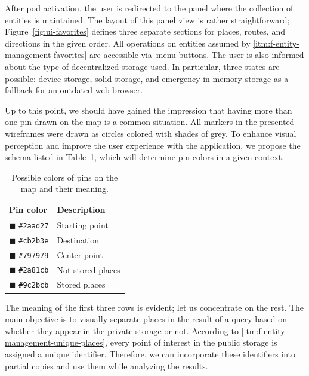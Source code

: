 After pod activation, the user is redirected to the panel where the collection of entities is maintained. The layout of this panel view is rather straightforward; Figure~\ref{fig:ui-favorites} defines three separate sections for places, routes, and directions in the given order. All operations on entities assumed by \ref{itm:f-entity-management-favorites} are accessible via~menu buttons. The user is also informed about the type of decentralized storage used. In particular, three states are possible: device storage, \acs{solid} storage, and emergency in-memory storage as a fallback for an outdated web browser.

Up to this point, we should have gained the impression that having more than one pin drawn on the map is a common situation. All markers in the presented wireframes were drawn as circles colored with shades of grey. To enhance visual perception and improve the user experience with the application, we propose the schema listed in Table~\ref{tab:pin-colors}, which will determine pin colors in a given context.

\bgroup
\def\arraystretch{1.2}
\begin{table}[h!]
\centering\footnotesize
\begin{tabular}{ l l }
\toprule
\textbf{Pin color}
  & \textbf{Description} \\
\midrule
\textcolor{SourcePlaceColor}{$\blacksquare$ \texttt{\#2aad27}}
  & Starting point \\
\textcolor{TargetPlaceColor}{$\blacksquare$ \texttt{\#cb2b3e}}
  & Destination \\
\textcolor{CenterPlaceColor}{$\blacksquare$ \texttt{\#797979}}
  & Center point \\
\textcolor{CommonPlaceColor}{$\blacksquare$ \texttt{\#2a81cb}}
  & Not stored places \\
\textcolor{StoredPlaceColor}{$\blacksquare$ \texttt{\#9c2bcb}}
  & Stored places \\
\bottomrule
\end{tabular}
\caption{Possible colors of pins on the map and their meaning.}
\label{tab:pin-colors}
\end{table}
\egroup

The meaning of the first three rows is evident; let us concentrate on the rest. The main objective is to visually separate places in the result of a query based on whether they appear in the private storage or not. According to \ref{itm:f-entity-management-unique-places}, every point of interest in the public storage is assigned a unique identifier. Therefore, we can in\-cor\-po\-rate these identifiers into partial copies and use them while analyzing the results.

